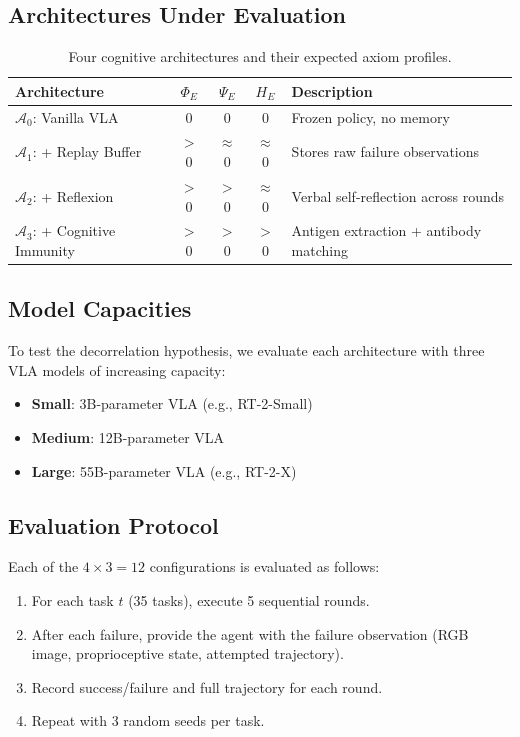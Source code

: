 \documentclass{article}
\newcommand{\cA}{\mathcal{A}}
\begin{document}
\subsection{Architectures Under Evaluation}

\begin{table}[h]
\centering
\caption{Four cognitive architectures and their expected axiom profiles.}
\label{tab:architectures}
\begin{tabular}{lcccp{5.5cm}}
\toprule
\textbf{Architecture} & $\Phi_E$ & $\Psi_E$ & $H_E$ & \textbf{Description} \\
\midrule
$\cA_0$: Vanilla VLA & 0 & 0 & 0 & Frozen policy, no memory \\
$\cA_1$: + Replay Buffer & $>$0 & $\approx$0 & $\approx$0 & Stores raw failure observations \\
$\cA_2$: + Reflexion & $>$0 & $>$0 & $\approx$0 & Verbal self-reflection across rounds \\
$\cA_3$: + Cognitive Immunity & $>$0 & $>$0 & $>$0 & Antigen extraction + antibody matching \\
\bottomrule
\end{tabular}
\end{table}

\subsection{Model Capacities}

To test the decorrelation hypothesis, we evaluate each architecture with three VLA models of increasing capacity:
\begin{itemize}[leftmargin=*,itemsep=1pt]
    \item \textbf{Small}: 3B-parameter VLA (e.g., RT-2-Small)
    \item \textbf{Medium}: 12B-parameter VLA
    \item \textbf{Large}: 55B-parameter VLA (e.g., RT-2-X)
\end{itemize}

\subsection{Evaluation Protocol}

Each of the $4 \times 3 = 12$ configurations is evaluated as follows:
\begin{enumerate}[leftmargin=*,itemsep=1pt]
    \item For each task $t$ (35 tasks), execute 5 sequential rounds.
    \item After each failure, provide the agent with the failure observation (RGB image, proprioceptive state, attempted trajectory).
    \item Record success/failure and full trajectory for each round.
    \item Repeat with 3 random seeds per task.
\end{enumerate}
\end{document}
